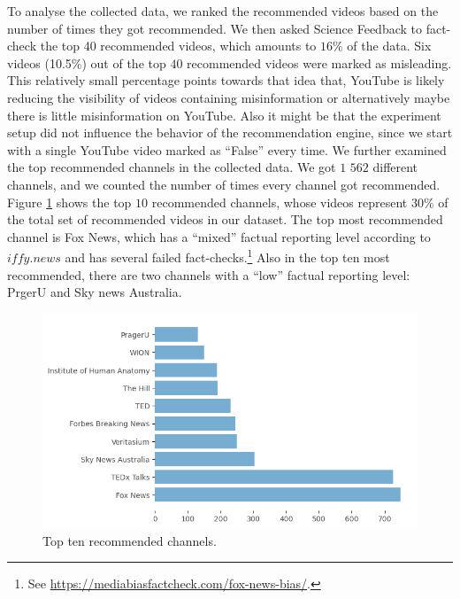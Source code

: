 \documentclass{article}
\begin{document}
\smallskip

To analyse the collected data, we ranked the recommended videos based on the number of times they got recommended. We then asked Science Feedback to fact-check the top 40 recommended videos, which amounts to $16\%$ of the data. Six videos (10.5\%) out of the top $40$ recommended videos were marked as misleading. This relatively small percentage points towards that idea that, YouTube is likely reducing the visibility of videos containing misinformation or alternatively maybe there is little misinformation on YouTube. Also it might be that the experiment setup did not influence the behavior of the recommendation engine, since we start with a single YouTube video marked as ``False'' every time. We further examined the top recommended channels in the collected data. We got $1$ $562$ different channels, and we counted the number of times every channel got recommended. Figure \ref{channels_yt} shows the top $10$ recommended channels, whose videos represent $30\%$ of the total set of recommended videos in our dataset. The top most recommended channel is Fox News, which has a ``mixed'' factual reporting level according to $iffy.news$ and has several failed fact-checks.\footnote{See \href{https://mediabiasfactcheck.com/fox-news-bias/}{https://mediabiasfactcheck.com/fox-news-bias/}.} Also in the top ten most recommended, there are two channels with a ``low'' factual reporting level: PrgerU and Sky news Australia. 

\begin{figure}[h]
	\begin{center}
		\includegraphics[scale=0.5]{./img/channel_youtube.png} 
	\end{center}
	\caption{Top ten recommended channels.}
	\label{channels_yt}
\end{figure}
\end{document}
